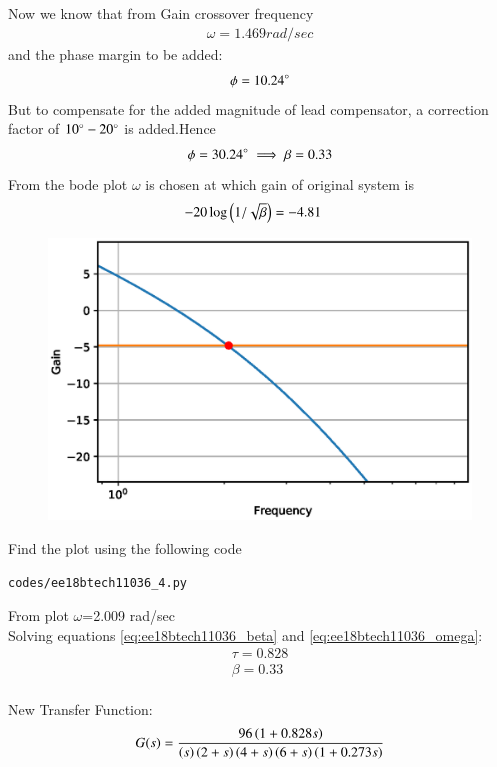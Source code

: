 \begin{enumerate}[label=\thesection.\arabic*.,ref=\thesection.\theenumi]
Now we know that from Gain crossover frequency
\begin{align}
\omega =1.469 rad/sec
\end{align}
and the phase margin to be added:
\begin{align}
\phi =10.24\degree
\end{align}
But to compensate for the added magnitude of lead compensator, a correction factor of $10\degree-20\degree$
is added.Hence
\begin{align}
\phi =30.24\degree
\implies \beta=0.33
\end{align}
From the bode plot $\omega$ is chosen at which gain of original system is
\begin{align}
-20\log\left(1/\sqrt{\beta}\right)&=-4.81
\end{align}
\begin{figure}[!h]
  \centering
  \includegraphics[width=\columnwidth]{./figs/ee18btech11036_3.eps}
  \caption{}
  \label{fig:ee18btech11036_3}
\end{figure}
Find the plot using the following code
\begin{lstlisting}
codes/ee18btech11036_4.py
\end{lstlisting}
From plot $\omega$=2.009 rad/sec\\
Solving equations \ref{eq:ee18btech11036_beta} and \ref{eq:ee18btech11036_omega}:
\begin{align}
\tau= 0.828\\
\beta=0.33\\
\label{eq:ee18btech11036_final}
\end{align}

New Transfer Function:
\begin{align}
G(s)=\frac{96\left(1+ 0.828s\right)}{\left(s\right)\left(2+s\right)\left(4+s\right)\left(6+s\right)\left(1+0.273s\right)}
\end{align}



\end{enumerate}
